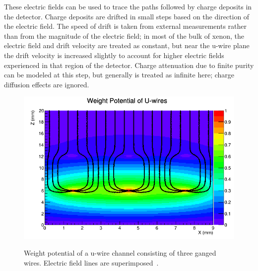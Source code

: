 These electric fields can be used to trace the paths followed by charge deposits in the detector.  Charge deposits are drifted in small steps based on the direction of the electric field.  The speed of drift is taken from external measurements rather than from the magnitude of the electric field; in most of the bulk of xenon, the electric field and drift velocity are treated as constant, but near the u-wire plane the drift velocity is increased slightly to account for higher electric fields experienced in that region of the detector.  Charge attenuation due to finite purity can be modeled at this step, but generally is treated as infinite here; charge diffusion effects are ignored.

\begin{figure}
\begin{center}
\includegraphics[keepaspectratio=true,width=\textwidth]{WeightPotContoursU_WithE.png}
\end{center}
\renewcommand{\baselinestretch}{1}
\small\normalsize
\begin{quote}
\caption{Weight potential of a u-wire channel consisting of three ganged wires.  Electric field lines are superimposed~\cite{MCDocumentRun2a}.}
\label{fig:UWireWeightPotential}
\end{quote}
\end{figure}
\renewcommand{\baselinestretch}{2}
\small\normalsize

